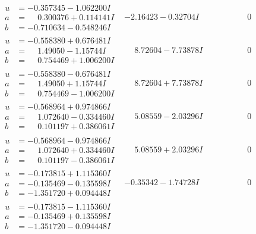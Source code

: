 \documentclass[1p]{elsarticle_modified}
\theoremstyle{definition}
\begin{document}
$$\begin{array}{c|c|c}
\begin{aligned}
u &= -0.357345 - 1.062200 I \\
a &= \phantom{-}0.300376 + 0.114141 I \\
b &= -0.710634 - 0.548246 I\end{aligned}
 & -2.16423 - 0.32704 I & \phantom{-0.000000 } 0 \\ \hline\begin{aligned}
u &= -0.558380 + 0.676481 I \\
a &= \phantom{-}1.49050 - 1.15744 I \\
b &= \phantom{-}0.754469 + 1.006200 I\end{aligned}
 & \phantom{-}8.72604 - 7.73878 I & \phantom{-0.000000 } 0 \\ \hline\begin{aligned}
u &= -0.558380 - 0.676481 I \\
a &= \phantom{-}1.49050 + 1.15744 I \\
b &= \phantom{-}0.754469 - 1.006200 I\end{aligned}
 & \phantom{-}8.72604 + 7.73878 I & \phantom{-0.000000 } 0 \\ \hline\begin{aligned}
u &= -0.568964 + 0.974866 I \\
a &= \phantom{-}1.072640 - 0.334460 I \\
b &= \phantom{-}0.101197 + 0.386061 I\end{aligned}
 & \phantom{-}5.08559 - 2.03296 I & \phantom{-0.000000 } 0 \\ \hline\begin{aligned}
u &= -0.568964 - 0.974866 I \\
a &= \phantom{-}1.072640 + 0.334460 I \\
b &= \phantom{-}0.101197 - 0.386061 I\end{aligned}
 & \phantom{-}5.08559 + 2.03296 I & \phantom{-0.000000 } 0 \\ \hline\begin{aligned}
u &= -0.173815 + 1.115360 I \\
a &= -0.135469 - 0.135598 I \\
b &= -1.351720 + 0.094448 I\end{aligned}
 & -0.35342 - 1.74728 I & \phantom{-0.000000 } 0 \\ \hline\begin{aligned}
u &= -0.173815 - 1.115360 I \\
a &= -0.135469 + 0.135598 I \\
b &= -1.351720 - 0.094448 I\end{aligned}

\end{array}$$
\end{document}
